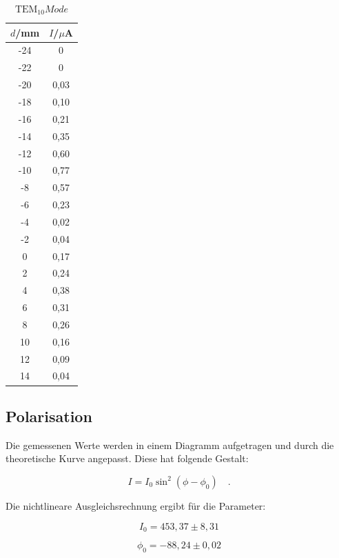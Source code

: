 \begin{table}[H]
	\begin{center}
		\begin{tabular}{c c}
			\toprule
			\(d\)/mm & \(I\)/\(\mu\)A \\
			\midrule
			-24     &0\\
			-22     &0\\
			-20     &0,03\\
			-18     &0,10\\
			-16     &0,21\\
			-14     &0,35\\
			-12     &0,60\\
			-10     &0,77\\
			-8      &0,57\\
			-6      &0,23\\
			-4      &0,02\\
			-2      &0,04\\
			0       &0,17\\
			2       &0,24\\
			4       &0,38\\
			6       &0,31\\
			8       &0,26\\
			10     & 0,16\\
			12      &0,09\\
			14      &0,04\\
			\bottomrule
		\end{tabular}
		\caption{\(\text{TEM}_{10} Mode\)}
		\label{tab:t6}
	\end{center}
\end{table}

\subsection{Polarisation}
Die gemessenen Werte werden in einem Diagramm aufgetragen und durch die theoretische Kurve angepasst. Diese hat folgende Gestalt:

\begin{equation}
I=I_0\sin^2{(\phi-\phi_0)}\quad.
\end{equation}

\noindent Die nichtlineare Ausgleichsrechnung ergibt für die Parameter:

\begin{equation*}
I_0=453,37\pm8,31
\end{equation*}

\begin{equation*}
\phi_0=-88,24\pm0,02
\end{equation*}

